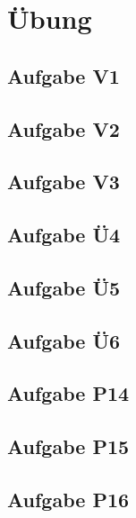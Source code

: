 
\section*{Übung }

\subsection*{Aufgabe V1}

\subsection*{Aufgabe V2}


\subsection*{Aufgabe V3}

\subsection*{Aufgabe Ü4}


\subsection*{Aufgabe Ü5}


\subsection*{Aufgabe Ü6}


\subsection*{Aufgabe P14}



\subsection*{Aufgabe P15} %


\subsection*{Aufgabe P16} %
